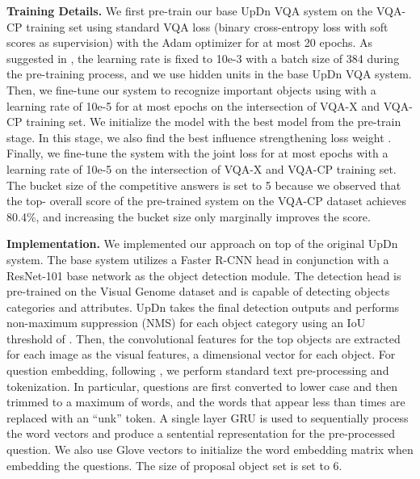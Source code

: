 \documentclass{article}
\begin{document}
\noindent\textbf{Training Details.} We first pre-train our base UpDn VQA system on the VQA-CP training set using standard VQA loss  (binary cross-entropy loss with soft scores as supervision) with the Adam optimizer \cite{kingma2014adam} for at most 20 epochs. As suggested in \cite{teney2017tips}, the learning rate is fixed to 10e-3 with a batch size of 384 during the pre-training process, and we use  hidden units in the base UpDn VQA system. 
Then, we fine-tune our system to recognize important objects using  with a learning rate of 10e-5 for at most  epochs on the intersection of VQA-X and VQA-CP training set. We initialize the model with the best model from the pre-train stage. In this stage, we also find the best influence strengthening loss weight .
Finally, we fine-tune the system with the joint loss  for at most  epochs with a learning rate of 10e-5 on the intersection of VQA-X and VQA-CP training set. The bucket size  of the competitive answers is set to 5 because we observed that the top- overall score of the pre-trained system on the VQA-CP dataset achieves 80.4\%, and increasing the bucket size only marginally improves the score.

\noindent\textbf{Implementation.}
We implemented our approach on top of the original UpDn system. The base system utilizes a Faster R-CNN head \cite{girshick2015fast} in conjunction with a ResNet-101 base network \cite{he2016deep} as the object detection module. The detection head is pre-trained on the Visual Genome dataset \cite{krishna2017visual} and is capable of detecting  objects categories and  attributes. UpDn takes the final detection outputs and performs non-maximum suppression (NMS) for each object category using an IoU threshold of . Then, the convolutional features for the top  objects are extracted for each image as the visual features,  a  dimensional vector for each object. For question embedding, following \cite{anderson2017bottom}, we perform standard text pre-processing and tokenization. In particular, questions are first converted to lower case and then trimmed to a maximum of  words, and the words that appear less than  times are replaced with an ``unk'' token. A single layer GRU \cite{cho2014learning} is used to sequentially process the word vectors and produce a sentential representation for the pre-processed question. We also use Glove vectors \cite{pennington2014glove} to initialize the word embedding matrix when embedding the questions. The size of proposal object set is set to 6.
\end{document}
